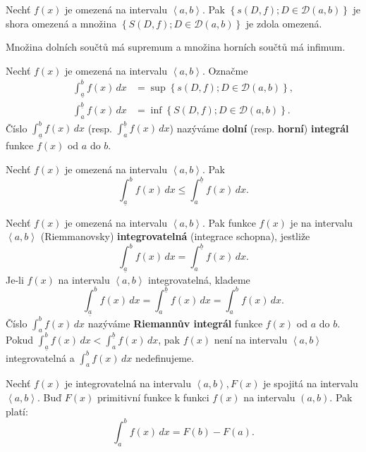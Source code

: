 \begin{veta}
Nechť $f(x)$ je omezená na intervalu $\left < a,b \right >. $ Pak
$\left \{ s(D,f); D\in \mathscr D(a,b) \right \} $ je shora omezená a množina
$\left \{ S(D,f); D\in \mathscr D(a,b) \right \} $ je zdola omezená.
\end{veta}

\begin{pozn}
     Množina dolních součtů má supremum a množina horních součtů má infimum.
\end{pozn}

\begin{definition}
Nechť $f(x)$ je omezená na intervalu $\left < a,b \right > .$ Označme
\begin{align*}
    \int_{\underline{a}} ^b f(x) \, dx & = \sup \left \{ s(D,f); D \in \mathscr D(a,b) \right \}, \\
    \int_{a} ^{\underline{b}} f(x) \, dx & = \inf \left \{ S(D,f); D \in \mathscr D(a,b) \right \}.
\end{align*}
Číslo $\int_{\underline{a}} ^b f(x)\, dx$ (resp. $\int_{a} ^{\underline{b}} f(x) \, dx$)
nazýváme \textbf{dolní} (resp. \textbf{horní}) \textbf{integrál} funkce $f(x)$ od
$a$ do $b$.
\end{definition}

\begin{veta}
Nechť $f(x)$ je omezená na intervalu $\left < a,b \right >. $ Pak
$$\int_{\underline{a}} ^b f(x)\, dx \leq \int_{a} ^{\underline{b}} f(x) \, dx.$$
\end{veta}

\begin{definition}
Nechť $f(x)$ je omezená na intervalu $\left < a,b \right > .$ Pak funkce
$f(x)$ je na intervalu $\left < a,b \right > $ (Riemmanovsky) \textbf{integrovatelná}
(integrace schopna), jestliže
$$\int_{\underline{a}} ^b f(x)\, dx = \int_{a} ^{\underline{b}} f(x) \, dx.$$
Je-li $f(x)$ na intervalu $\left < a,b \right > $ integrovatelná, klademe
$$\int_{\underline{a}} ^b f(x)\, dx = \int_{a} ^{\underline{b}} f(x) \, dx = \int_{a} ^b f(x) \, dx.$$
Číslo $\int_{a} ^b f(x)\, dx$ nazýváme \textbf{Riemannův integrál} funkce $f(x)$ od
$a$ do $b$. Pokud $\int_{\underline{a}} ^b f(x)\, dx < \int_{a} ^{\underline{b}} f(x) \, dx$,
pak $f(x)$ není na intervalu $\left < a,b \right > $ integrovatelná a
$\int_{a} ^b f(x)\, dx$ nedefinujeme.
\end{definition}

\begin{veta}
Nechť $f(x)$ je integrovatelná na intervalu $\left < a,b \right > , F(x)$ je spojitá
na intervalu $\left < a,b \right > $. Buď $F(x)$ primitivní funkce k funkci $f(x)$
na intervalu $\left ( a,b \right ) $. Pak platí:
$$\int_{a} ^b f(x)\, dx=F(b)-F(a).$$
\end{veta}

